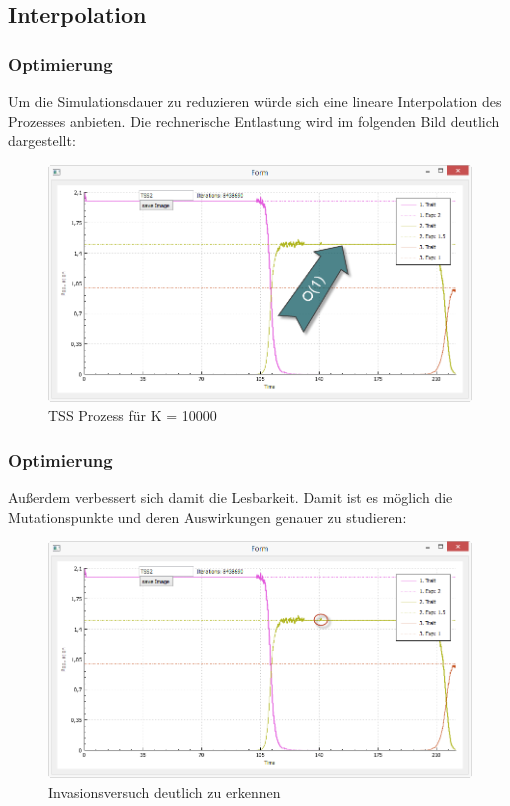 \documentclass{beamer}
\begin{document}
	\subsection{Interpolation}
		\begin{frame}
			\frametitle{Optimierung}
			Um die Simulationsdauer zu reduzieren würde sich eine lineare Interpolation des Prozesses anbieten. Die rechnerische Entlastung wird im folgenden Bild deutlich dargestellt:
			\pause
			\begin{figure}[H]
				\centering
				\includegraphics[width=0.7\linewidth]{./TSS_interpolated}
				\caption[TSS_interpolated]{TSS Prozess für K = 10000}
				\label{fig:TSS_interpolated}
			\end{figure}
		\end{frame}	
		\begin{frame}
			\frametitle{Optimierung}
			Außerdem verbessert sich damit die Lesbarkeit. Damit ist es möglich die Mutationspunkte und deren Auswirkungen genauer zu studieren:
			\pause
			\begin{figure}[H]
				\centering
				\includegraphics[width=0.8\linewidth]{./TSS_Mutation}
				\caption[Invasionsversuch]{Invasionsversuch deutlich zu erkennen}
				\label{fig:TSS_Mutation}
			\end{figure}
		\end{frame}	
\end{document}
